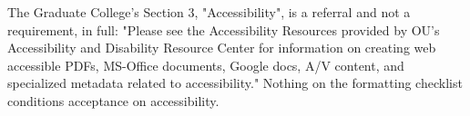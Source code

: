 %
	{The Graduate College's Section 3, "Accessibility", is a referral and not a
	 requirement, in full: "Please see the Accessibility Resources provided by
	 OU's Accessibility and Disability Resource Center for information on
	 creating web accessible PDFs, MS-Office documents, Google docs, A/V
	 content, and specialized metadata related to accessibility." Nothing on the
	 formatting checklist conditions acceptance on accessibility.}

